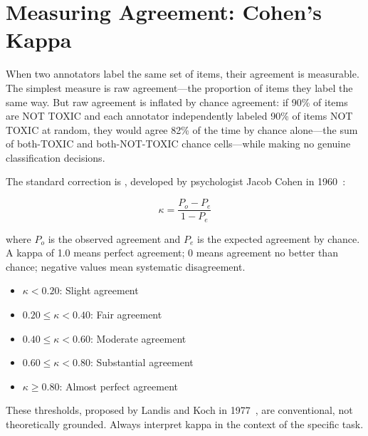 \section{Measuring Agreement: Cohen's Kappa}
\label{sec:ch7-kappa}

When two annotators label the same set of items, their agreement is measurable. The simplest measure is raw agreement---the proportion of items they label the same way. But raw agreement is inflated by chance agreement: if 90\% of items are NOT TOXIC and each annotator independently labeled 90\% of items NOT TOXIC at random, they would agree 82\% of the time by chance alone---the sum of both-TOXIC and both-NOT-TOXIC chance cells---while making no genuine classification decisions.

The standard correction is , developed by psychologist Jacob Cohen in 1960~\autocite{cohen1960kappa}:

\[
\kappa = \frac{P_o - P_e}{1 - P_e}
\]

where $P_o$ is the observed agreement and $P_e$ is the expected agreement by chance. A kappa of 1.0 means perfect agreement; 0 means agreement no better than chance; negative values mean systematic disagreement.

\begin{keyconcept}
\begin{itemize}
    \item $\kappa < 0.20$: Slight agreement
    \item $0.20 \leq \kappa < 0.40$: Fair agreement
    \item $0.40 \leq \kappa < 0.60$: Moderate agreement
    \item $0.60 \leq \kappa < 0.80$: Substantial agreement
    \item $\kappa \geq 0.80$: Almost perfect agreement
\end{itemize}
These thresholds, proposed by Landis and Koch in 1977~\autocite{landis1977kappa}, are conventional, not theoretically grounded. Always interpret kappa in the context of the specific task.
\end{keyconcept}

